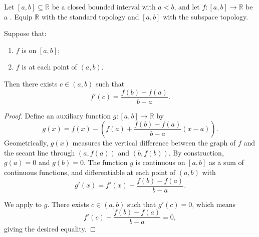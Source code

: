 \begin{theorem} \label{theorem:mean_value_theorem_that_derivative_of_a_real_valued_differentiable_functions_on_real_intervals_achieves_the_slope_of_the_secant}
    Let $[a, b] \subseteq \mathbb{R}$ be a closed bounded interval with $a < b$, and let $f : [a, b] \to \mathbb{R}$ be a . Equip $\mathbb{R}$ with the standard topology and $[a, b]$ with the subspace topology.

    Suppose that:
    \begin{enumerate}
        \item $f$ is  on $[a, b]$;
        \item $f$ is  at each point of $(a, b)$.
    \end{enumerate}
    Then there exists $c \in (a, b)$ such that
    $$f'(c) = \frac{f(b) - f(a)}{b - a}.$$
\end{theorem}

\begin{proof}
    Define an auxiliary function $g : [a, b] \to \mathbb{R}$ by
    $$g(x) = f(x) - \left( f(a) + \frac{f(b) - f(a)}{b - a}(x - a) \right).$$
    Geometrically, $g(x)$ measures the vertical difference between the graph of $f$ and the secant line through $(a, f(a))$ and $(b, f(b))$. By construction, $g(a) = 0$ and $g(b) = 0$. The function $g$ is continuous on $[a, b]$ as a sum of continuous functions, and differentiable at each point of $(a, b)$ with
    $$g'(x) = f'(x) - \frac{f(b) - f(a)}{b - a}.$$

    We apply  to $g$. There exists $c \in (a, b)$ such that $g'(c) = 0$, which means
    $$f'(c) - \frac{f(b) - f(a)}{b - a} = 0,$$
    giving the desired equality.
\end{proof}
